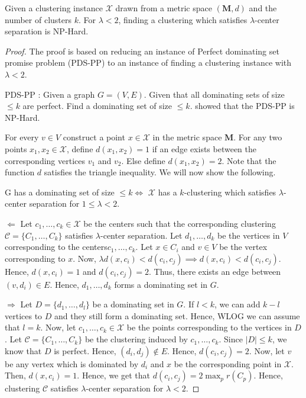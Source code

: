\documentclass[anon,12pt]{colt2016} %
\newcommand{\mc}{\mathcal}
\newcommand{\mb}{\mathbf}
\begin{document}
\begin{theorem}
Given a clustering instance $\mc X$ drawn from a metric space $(\mb M, d)$ and the number of clusters $k$. For $\lambda < 2$, finding a clustering which satisfies $\lambda$-center separation is NP-Hard.
\end{theorem}
\begin{proof}
The proof is based on reducing an instance of Perfect dominating set promise problem (PDS-PP) to an instance of finding a clustering instance with $\lambda < 2$.

PDS-PP : Given a graph $G = (V, E)$. Given that all dominating sets of size $\le k$ are perfect. Find a dominating set of size $\le k$. \cite{reyzin2012data} showed that the PDS-PP is NP-Hard. 

For every $v \in V$ construct a point $x \in \mc X$ in the metric space $\mb M$. For any two points $x_1, x_2 \in \mc X$, define $d(x_1, x_2) = 1$ if an edge exists between the corresponding vertices $v_1$ and $v_2$. Else define $d(x_1, x_2) = 2$. Note that the function $d$ satisfies the triangle inequality. We will now show the following.

G has a dominating set of size $\le k \iff$ $\mc X$ has a $k$-clustering which satisfies $\lambda$-center separation for $1 \le \lambda < 2$.

$\Leftarrow$  Let $c_1, \ldots, c_k \in \mc X$ be the centers such that the corresponding clustering $\mc C = \{C_1, \ldots, C_k\}$ satisfies $\lambda$-center separation. Let $d_1, \ldots, d_k$ be the vertices in $V$ corresponding to the centers$c_1, \ldots, c_k$. Let $x \in C_i$ and $v \in V$ be the vertex corresponding to $x$. Now, $\lambda d(x, c_i) < d(c_i, c_j) \implies d(x, c_i) < d(c_i, c_j)$. Hence, $d(x, c_i) = 1$ and $d(c_i, c_j) = 2$. Thus, there exists an edge between $(v, d_i) \in E$. Hence, $d_1, \ldots, d_k$ forms a dominating set in $G$.

$\Rightarrow$ Let $D = \{d_1, \ldots, d_l\}$ be a dominating set in $G$. If $l < k$, we can add $k-l$ vertices to $D$ and they still form a dominating set. Hence, WLOG we can assume that $l = k$. Now, let $c_1, \ldots, c_k \in \mc X$ be the points corresponding to the vertices in $D$. Let $\mc C = \{C_1, \ldots, C_k\}$ be the clustering induced by $c_1, \ldots, c_k$. Since $|D| \le k$, we know that $D$ is perfect. Hence, $(d_i, d_j) \not\in E$. Hence, $d(c_i, c_j) = 2$. Now, let $v$ be any vertex which is dominated by $d_i$ and $x$ be the corresponding point in $\mc X$. Then, $d(x, c_i) = 1$. Hence, we get that $d(c_i, c_j) = 2 \max_p r(C_p)$. Hence, clustering $\mc C$ satisfies $\lambda$-center separation for $\lambda < 2$.
\end{proof}
\end{document}
